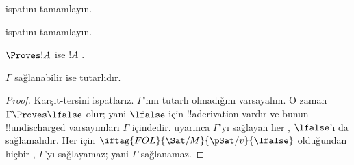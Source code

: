 \begin{prob}
 ispatını tamamlayın.
\end{prob}
\tagendprob

\begin{prob}
 ispatını tamamlayın.
\end{prob}
\tagendprob

\begin{cor}
$\Proves !A$ ise $!A$ .
\end{cor}

\begin{cor}
$\Gamma$ sağlanabilir ise tutarlıdır.
\end{cor}

\begin{proof}
Karşıt-tersini ispatlarız. $\Gamma$'nın tutarlı olmadığını varsayalım. O zaman
$\Gamma \Proves \lfalse$ olur; yani $\lfalse$ için !!a{derivation} vardır ve
bunun !!{undischarged} varsayımları $\Gamma$ içindedir.
 uyarınca $\Gamma$'yı sağlayan her
,
$\lfalse$'ı da sağlamalıdır. Her
 için
$\iftag{FOL}{\Sat/{M}}{\pSat/{v}}{\lfalse}$ olduğundan hiçbir
, $\Gamma$'yı sağlayamaz; yani
$\Gamma$ sağlanamaz.
\end{proof}

